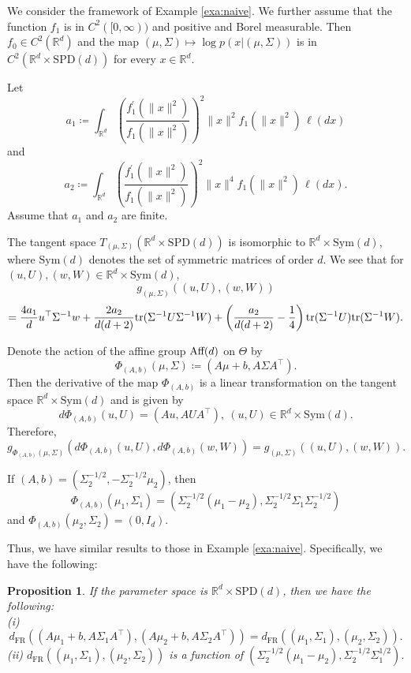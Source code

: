 \documentclass[a4paper, reqno, 11pt]{article}
\newtheorem{Prop}[Thm]{Proposition}
\theoremstyle{definition}
\def\Sym{\mathrm{Sym}}
\def\SPD{\mathrm{SPD}}
\def\FR{{\mathrm{FR}}}
\begin{document}
We consider the framework of Example \ref{exa:naive}. 
We further assume that the function $f_1$ is in $C^2 ([0,\infty))$ and positive and Borel measurable. 
Then $f_0 \in C^2 (\mathbb{R}^d)$ and the  map $(\mu, \Sigma) \mapsto \log p\left(x | (\mu, \Sigma) \right)$ is in $C^2 \left(\mathbb{R}^d \times \SPD(d)\right)$ for every $x \in \mathbb{R}^d$. 

Let 
\[ a_1 \coloneqq  \int_{\mathbb{R}^d} \left( \frac{ f_1^{\prime} \left(\|x\|^2 \right)}{ f_1 \left(\|x\|^2 \right)}\right)^2 \|x\|^2 f_1 \left(\|x\|^2 \right) \, \ell(dx)  \]
and 
\[ a_2 \coloneqq  \int_{\mathbb{R}^d} \left( \frac{ f_1^{\prime} \left(\|x\|^2 \right)}{ f_1 \left(\|x\|^2 \right)}\right)^2 \|x\|^4 f_1 \left(\|x\|^2 \right) \, \ell(dx). \]
Assume that $a_1$ and $a_2$ are finite. 

The tangent space $T_{(\mu, \Sigma)} (\mathbb{R}^d \times \SPD(d))$ is isomorphic to $\mathbb{R}^d \times \Sym(d)$, where $\Sym(d)$ denotes the set of symmetric matrices of order $d$.  
We see that for $(u,U), (w,W) \in \mathbb{R}^d \times \Sym(d)$, 
\[ g_{(\mu, \Sigma)} \left( (u,U), (w,W)\right) \]
\[ = \frac{4a_1}{d} u^{\top} \Sigma^{-1} w + \frac{2 a_2}{d(d+2)} \textup{tr}(\Sigma^{-1}U\Sigma^{-1}W) + \left(\frac{a_2}{d(d+2)}  - \frac{1}{4} \right) \textup{tr}(\Sigma^{-1}U) \textup{tr}(\Sigma^{-1}W). \]

Denote the action of the affine group $\textup{Aff}(d)$ on $\Theta$ by 
\[ \Phi_{(A,b)}(\mu, \Sigma) \coloneqq  (A\mu + b, A \Sigma A^{\top}). \]
Then the derivative of the map $\Phi_{(A,b)}$ is a linear transformation on the tangent space $\mathbb{R}^d \times \Sym(d)$ and is  given by 
\[ d\Phi_{(A,b)} (u,U) = \left(Au, AUA^{\top} \right), \ (u,U) \in \mathbb{R}^d \times \Sym(d). \]
Therefore, 
\[ g_{\Phi_{(A,b)} (\mu, \Sigma)} \left(  d\Phi_{(A,b)}(u,U),  d\Phi_{(A,b)}(w,W)\right) = g_{(\mu, \Sigma)} \left( (u,U), (w,W)\right). \]

If $(A,b) = \left(\Sigma_2^{-1/2}, - \Sigma_2^{-1/2} \mu_2 \right)$, then \[ \Phi_{(A,b)}(\mu_1, \Sigma_1) = \left(\Sigma_2^{-1/2}(\mu_1 - \mu_2),  \Sigma_2^{-1/2} \Sigma_1 \Sigma_2^{-1/2} \right)\] 
and $\Phi_{(A,b)}(\mu_2, \Sigma_2) = (0, I_d)$. 

Thus, we have similar results to those in Example \ref{exa:naive}.  
Specifically, we have the following: 
\begin{Prop}
If the parameter space is $\mathbb{R}^d \times \SPD(d)$, then we have the following:\\
(i) 
\[ d_{\FR}\left((A\mu_1 + b, A\Sigma_1 A^{\top}), (A\mu_2 + b,  A\Sigma_2 A^{\top}) \right) = d_{\FR} \left((\mu_1, \Sigma_1), (\mu_2, \Sigma_2)\right). \]
(ii) 
$d_{\FR} \left((\mu_1, \Sigma_1), (\mu_2, \Sigma_2)\right)$ is a function of $\left(\Sigma_2^{-1/2}(\mu_1 - \mu_2), \Sigma_2^{-1/2}\Sigma_1^{1/2} \right)$. 
\end{Prop}
\end{document}
